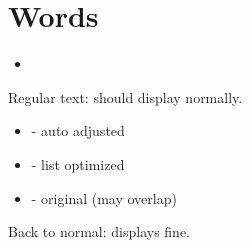 \langJP

\chapter{Words}


\begin{itemize}
  \item {}


\end{itemize}


Regular text:  should display normally.

\begin{itemize}
    \item {} - auto adjusted
    \item {} - list optimized  
    \item {} - original (may overlap)
\end{itemize}

Back to normal:  displays fine.
